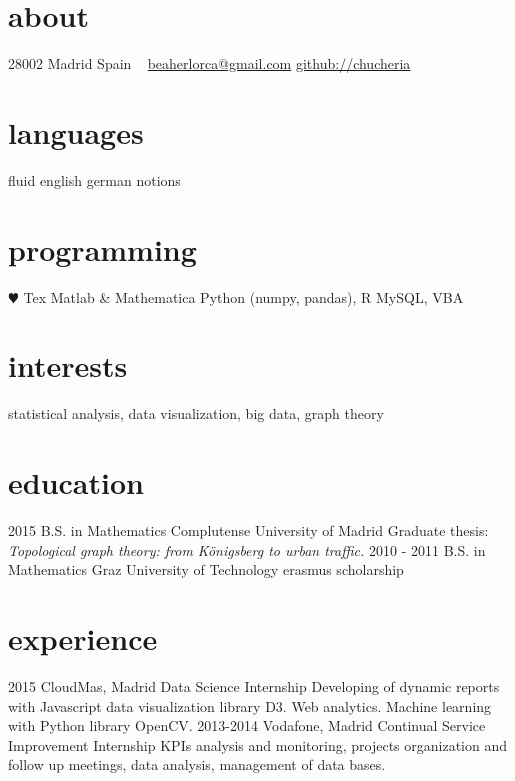 \documentclass[]{friggeri-cv}
\begin{document}
\ifenglish
{}
       {}


\begin{aside}
  \section{about}
    28002 Madrid
    Spain
    ~
    \href{mailto:beaherlorca@gmail.com}{beaherlorca@gmail.com}
    \href{https://github.com/chucheria}{github://chucheria}
  \section{languages}
    fluid english
    german notions
  \section{programming}
    {\color{red} $\varheartsuit$} Tex
    Matlab \& Mathematica
    Python (numpy, pandas), R
    MySQL, VBA
\end{aside}

\section{interests}

statistical analysis, data visualization, big data, graph theory


\section{education}

\begin{entrylist}
  \entry
    {2015}
    {B.S. in Mathematics}
    {Complutense University of Madrid}
    {Graduate thesis: \emph{Topological graph theory: from Königsberg to urban traffic.}}
  \entry
    {2010 - 2011}
    {B.S. in Mathematics}
    {Graz University of Technology}
    {erasmus scholarship}
\end{entrylist}

\section{experience}

\begin{entrylist}
  \entry
    {2015}
    {CloudMas, Madrid}
    {Data Science Internship}
    {Developing of dynamic reports with Javascript data visualization library D3. Web analytics. Machine learning with Python library OpenCV.}
  \entry
    {2013-2014}
    {Vodafone, Madrid}
    {Continual Service Improvement Internship}
    {KPIs analysis and monitoring, projects organization and follow up meetings, data analysis, management of data bases.}
\end{entrylist}
\end{document}
